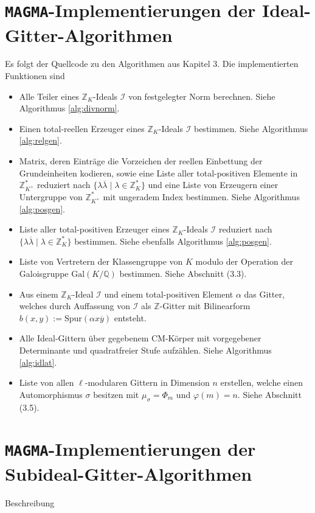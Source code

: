 \documentclass[12pt,a4paper,halfparskip,headsepline,bibtotocnumbered]{scrreprt}
\theoremstyle{nummermitklammern}
\theoremstyle{nonumberbreak}
\newcommand{\Z}{\mathbb{Z}}
\newcommand{\Q}{\mathbb{Q}}
\newcommand{\I}{\mathcal{I}}
\begin{document}
\section{\texttt{MAGMA}-Implementierungen der Ideal-Gitter-Algorithmen}
Es folgt der Quellcode zu den Algorithmen aus Kapitel 3. Die implementierten Funktionen sind
\begin{itemize}
	\item Alle Teiler eines $\Z_K$-Ideals $\I$ von festgelegter Norm berechnen. Siehe Algorithmus \eqref{alg:divnorm}.
	\item Einen total-reellen Erzeuger eines $\Z_K$-Ideals $\I$ bestimmen. Siehe Algorithmus \eqref{alg:relgen}.
	\item Matrix, deren Einträge die Vorzeichen der reellen Einbettung der Grundeinheiten kodieren, sowie eine Liste aller total-positiven Elemente in $\Z_{K^+}^\ast$ reduziert nach $\lbrace \lambda \overline{\lambda} \mid \lambda \in \Z_K^\ast \rbrace$ und eine Liste von Erzeugern einer Untergruppe von $\Z_{K^+}^\ast$ mit ungeradem Index bestimmen. Siehe Algorithmus \eqref{alg:posgen}.
	\item Liste aller total-positiven Erzeuger eines $\Z_K$-Ideals $\I$ reduziert nach $\lbrace \lambda \overline{\lambda} \mid \lambda \in \Z_K^\ast \rbrace$ bestimmen. Siehe ebenfalls Algorithmus \eqref{alg:posgen}.
	\item Liste von Vertretern der Klassengruppe von $K$ modulo der Operation der Galoisgruppe $\text{Gal}(K/\Q)$ bestimmen. Siehe Abschnitt (3.3).
	\item Aus einem $\Z_K$-Ideal $\I$ und einem total-positiven Element $\alpha$ das Gitter, welches durch Auffassung von $\I$ als $\Z$-Gitter mit Bilinearform $b(x,y) := \text{Spur}(\alpha x \overline{y})$ entsteht.
	\item Alle Ideal-Gittern über gegebenem CM-Körper mit vorgegebener Determinante und quadratfreier Stufe aufzählen. Siehe Algorithmus \eqref{alg:idlat}.
	\item Liste von allen $\ell$-modularen Gittern in Dimension $n$ erstellen, welche einen Automorphismus $\sigma$ besitzen mit $\mu_\sigma = \Phi_m$ und $\varphi(m) = n$. Siehe Abschnitt (3.5).
\end{itemize}


\section{\texttt{MAGMA}-Implementierungen der Subideal-Gitter-Algorithmen}
Beschreibung

\end{document}
